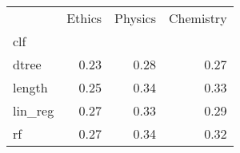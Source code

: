 \begin{tabular}{lrrr}
\toprule
{} &  Ethics &  Physics &  Chemistry \\
clf     &         &          &            \\
\midrule
dtree   &    0.23 &     0.28 &       0.27 \\
length  &    0.25 &     0.34 &       0.33 \\
lin\_reg &    0.27 &     0.33 &       0.29 \\
rf      &    0.27 &     0.34 &       0.32 \\
\bottomrule
\end{tabular}

